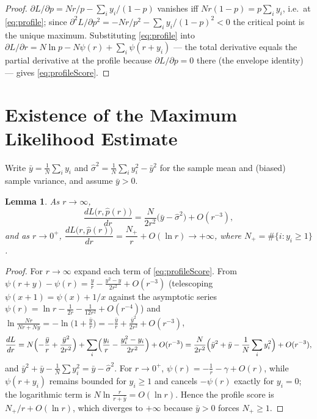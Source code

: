\documentclass[11pt]{article}
\newtheorem{lemma}[theorem]{Lemma}
\begin{document}
\begin{proof}
$\partial L/\partial p=Nr/p-\sum_{i}y_{i}/(1-p)$ vanishes iff
$Nr(1-p)=p\sum_{i}y_{i}$, i.e.\ at \eqref{eq:profile}; since
$\partial^{2}L/\partial p^{2}=-Nr/p^{2}-\sum_{i}y_{i}/(1-p)^{2}<0$
the critical point is the unique maximum. Substituting \eqref{eq:profile}
into $\partial L/\partial r=N\ln p-N\psi(r)+\sum_{i}\psi(r+y_{i})$ — the
total derivative equals the partial derivative at the profile because
$\partial L/\partial p=0$ there (the envelope identity) — gives
\eqref{eq:profileScore}.
\end{proof}

\section{Existence of the Maximum Likelihood Estimate}

Write $\bar y=\frac1N\sum_{i}y_{i}$ and
$\hat\sigma^{2}=\frac1N\sum_{i}y_{i}^{2}-\bar y^{2}$ for the sample mean and
(biased) sample variance, and assume $\bar y>0$.

\begin{lemma}\label{lem:asymptotics}
As $r\to\infty$,
\begin{equation}
\frac{dL\bigl(r,\hat p(r)\bigr)}{dr}
=\frac{N}{2r^{2}}\bigl(\bar y-\hat\sigma^{2}\bigr)+O(r^{-3}),
\end{equation}
and as $r\to0^{+}$,
$\dfrac{dL\bigl(r,\hat p(r)\bigr)}{dr}=\dfrac{N_{+}}{r}+O(\ln r)\to+\infty$,
where $N_{+}=\#\{i:y_{i}\ge1\}$.
\end{lemma}

\begin{proof}
For $r\to\infty$ expand each term of \eqref{eq:profileScore}. From
$\psi(r+y)-\psi(r)=\frac{y}{r}-\frac{y^{2}-y}{2r^{2}}+O(r^{-3})$
(telescoping $\psi(x+1)=\psi(x)+1/x$ against the asymptotic series
$\psi(r)=\ln r-\frac{1}{2r}-\frac{1}{12r^{2}}+O(r^{-4})$) and
$\ln\frac{Nr}{Nr+N\bar y}=-\ln\bigl(1+\tfrac{\bar y}{r}\bigr)
=-\frac{\bar y}{r}+\frac{\bar y^{2}}{2r^{2}}+O(r^{-3})$,
\[
\frac{dL}{dr}
=N\Bigl(-\frac{\bar y}{r}+\frac{\bar y^{2}}{2r^{2}}\Bigr)
+\sum_{i}\Bigl(\frac{y_{i}}{r}-\frac{y_{i}^{2}-y_{i}}{2r^{2}}\Bigr)+O(r^{-3})
=\frac{N}{2r^{2}}\Bigl(\bar y^{2}+\bar y-\frac1N\sum_{i}y_{i}^{2}\Bigr)+O(r^{-3}),
\]
and $\bar y^{2}+\bar y-\frac1N\sum y_{i}^{2}=\bar y-\hat\sigma^{2}$. For
$r\to0^{+}$, $\psi(r)=-\frac1r-\gamma+O(r)$, while $\psi(r+y_{i})$ remains
bounded for $y_{i}\ge1$ and cancels $-\psi(r)$ exactly for $y_{i}=0$; the
logarithmic term is $N\ln\frac{r}{r+\bar y}=O(\ln r)$. Hence the profile
score is $N_{+}/r+O(\ln r)$, which diverges to $+\infty$ because $\bar y>0$
forces $N_{+}\ge1$.
\end{proof}
\end{document}
